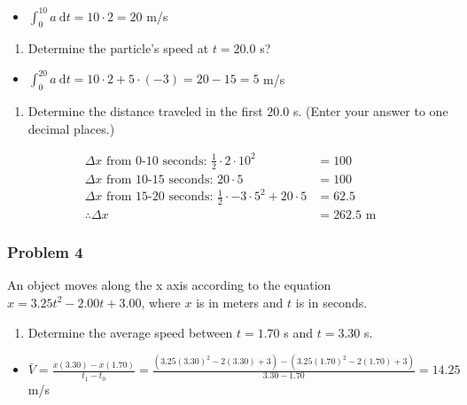 \documentclass[
  letterpaper,
  DIV=11,
  numbers=noendperiod]{scrartcl}
\providecommand{\tightlist}{%
  \setlength{\itemsep}{0pt}\setlength{\parskip}{0pt}}\usepackage{longtable,booktabs,array}
\begin{document}
\begin{itemize}
\tightlist
\item
  \(\int_0^{10} a \ \mathrm{d}t = 10 \cdot 2 = 20\) m/s
\end{itemize}

\begin{enumerate}
\def\labelenumi{(\alph{enumi})}
\setcounter{enumi}{1}
\tightlist
\item
  Determine the particle's speed at \(t = 20.0\) s?
\end{enumerate}

\begin{itemize}
\tightlist
\item
  \(\int_0^{20} a \ \mathrm{d}t = 10 \cdot 2 + 5 \cdot (-3) = 20 - 15 = 5\)
  m/s
\end{itemize}

\begin{enumerate}
\def\labelenumi{(\alph{enumi})}
\setcounter{enumi}{2}
\tightlist
\item
  Determine the distance traveled in the first \(20.0\) s. (Enter your
  answer to one decimal places.)
\end{enumerate}

\begin{align*}
\Delta x \text{ from 0-10 seconds: }\frac{1}{2} \cdot 2 \cdot 10^2 &= 100 \\
\Delta x \text{ from 10-15 seconds: }20 \cdot 5 &= 100 \\
\Delta x \text{ from 15-20 seconds: } \frac{1}{2} \cdot -3 \cdot 5^2 + 20 \cdot 5 &= 62.5 \\
\therefore \Delta x &= 262.5 \text{ m}
\end{align*}

\hypertarget{problem-4-2}{%
\subsubsection{Problem 4}\label{problem-4-2}}

An object moves along the x axis according to the equation
\(x = 3.25t^2 − 2.00t + 3.00\), where \(x\) is in meters and \(t\) is in
seconds.

\begin{enumerate}
\def\labelenumi{(\alph{enumi})}
\tightlist
\item
  Determine the average speed between \(t = 1.70\) s and \(t = 3.30\) s.
\end{enumerate}

\begin{itemize}
\tightlist
\item
  \(\bar{V} = \frac{x(3.30)-x(1.70)}{t_1-t_0} = \frac{(3.25(3.30)^2-2(3.30)+3) - (3.25(1.70)^2-2(1.70)+3)}{3.30-1.70} = 14.25\)
  m/s
\end{itemize}
\end{document}
